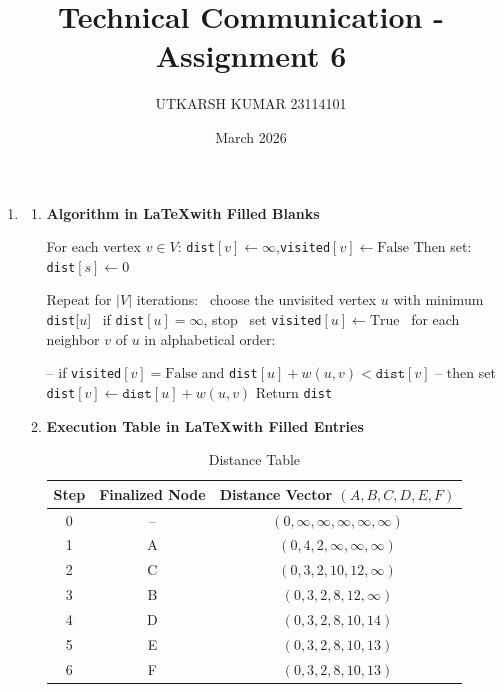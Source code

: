 \documentclass{article}
\title{Technical Communication - Assignment 6}
\author{UTKARSH KUMAR 23114101}
\date{March 2026}
\begin{document}
\maketitle

\begin{enumerate}
    \item 
\begin{enumerate}
    \item 
\textbf{Algorithm in \LaTeX with Filled Blanks}
\begin{algorithm}[H]
\caption{Dijkstra's Algorithm}

\begin{algorithmic}[]

\State For each vertex $v \in V$:
    \State \qquad \texttt{dist}$[v] \gets \infty$,\qquad \texttt{visited}$[v] \gets \text{False}$
\State Then set:
    \State \qquad \texttt{dist}$[s] \gets 0$
    
\State Repeat for $|V|$ iterations:
    \State \qquad \textbullet\ choose the unvisited vertex $u$ with minimum \texttt{dist}[$u$]
    \State \qquad \textbullet\ if \texttt{dist}$[u] = \infty$, stop
    \State \qquad \textbullet\ set \texttt{visited}$[u] \gets \text{True}$
    \State \qquad \textbullet\ for each neighbor $v$ of $u$ in alphabetical order:
    
    \State \qquad \qquad -- if \texttt{visited}$[v] = \text{False}$ and \texttt{dist}$[u] + w(u, v) < \texttt{dist}[v]$
    \State \qquad \qquad -- then set \texttt{dist}$[v] \gets \texttt{dist}[u] + w(u, v)$
\State Return \texttt{dist}
\end{algorithmic}
\end{algorithm}

\item \textbf{Execution Table in \LaTeX with Filled Entries}
\begin{table}[h]
    \centering
    \begin{tabular}{c|c|c}
        \toprule
        Step & Finalized Node & Distance Vector $(A, B, C, D, E, F)$ \\
        \midrule
        0 & -- & $(0, \infty, \infty, \infty, \infty, \infty)$ \\
        1 & A & $(0, 4, 2, \infty, \infty, \infty)$ \\
        2 & C & $(0, 3, 2, 10, 12, \infty)$ \\
        3 & B & $(0, 3, 2, 8, 12, \infty)$ \\
        4 & D & $(0, 3, 2, 8, 10, 14)$ \\
        5 & E & $(0, 3, 2, 8, 10, 13)$ \\
        6 & F & $(0, 3, 2, 8, 10, 13)$ \\
        \bottomrule
    \end{tabular}
    \caption{Distance Table}
\end{table}


\end{enumerate}
\end{enumerate}
\end{document}

